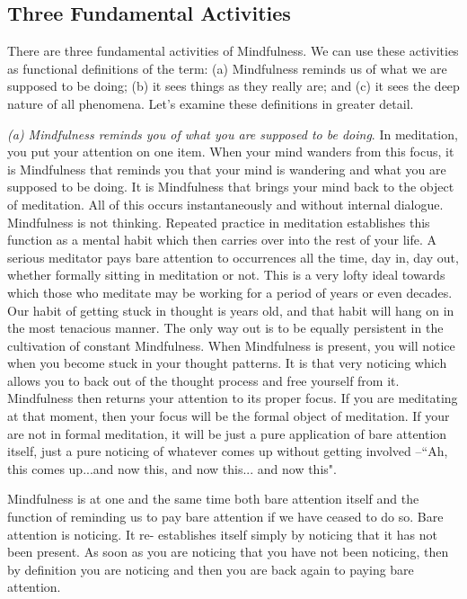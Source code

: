 \subsection*{Three Fundamental Activities}
 There are three fundamental activities of
Mindfulness. We can use these activities as functional definitions of the term:
(a) Mindfulness reminds us of what we are supposed to be doing; (b) it sees
things as they really are; and (c) it sees the deep nature of all phenomena.
Let's examine these definitions in greater detail.

\emph{(a) Mindfulness reminds you of what you are supposed to be doing}. In
meditation, you put your attention on one item. When your mind wanders from this
focus, it is Mindfulness that reminds you that your mind is wandering and what
you are supposed to be doing. It is Mindfulness that brings your mind back to
the object of meditation. All of this occurs instantaneously and without
internal dialogue. Mindfulness is not thinking. Repeated practice in meditation
establishes this function as a mental habit which then carries over into the
rest of your life. A serious meditator pays bare attention to occurrences all
the time, day in, day out, whether formally sitting in meditation or not. This
is a very lofty ideal towards which those who meditate may be working for a
period of years or even decades. Our habit of getting stuck in thought is years
old, and that habit will hang on in the most tenacious manner. The only way out
is to be equally persistent in the cultivation of constant Mindfulness. When
Mindfulness is present, you will notice when you become stuck in your thought
patterns. It is that very noticing which allows you to back out of the thought
process and free yourself from it. Mindfulness then returns your attention to
its proper focus. If you are meditating at that moment, then your focus will be
the formal object of meditation. If your are not in formal meditation, it will
be just a pure application of bare attention itself, just a pure noticing of
whatever comes up without getting involved --``Ah, this comes up...and now this,
and now this... and now this".

Mindfulness is at one and the same time both bare attention itself and the
function of reminding us to pay bare attention if we have ceased to do so. Bare
attention is noticing. It re- establishes itself simply by noticing that it has
not been present. As soon as you are noticing that you have not been noticing,
then by definition you are noticing and then you are back again to paying bare
attention.

